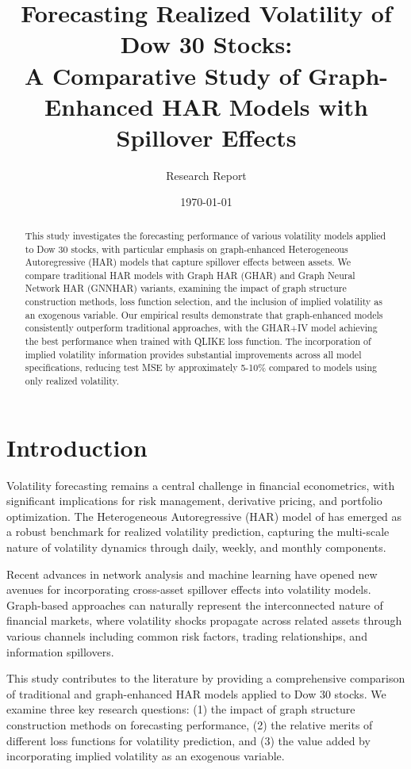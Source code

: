 \documentclass[12pt,a4paper]{article}
\title{Forecasting Realized Volatility of Dow 30 Stocks: \\
A Comparative Study of Graph-Enhanced HAR Models with Spillover Effects}
\author{Research Report}
\date{\today}
\begin{document}
\maketitle

\begin{abstract}
This study investigates the forecasting performance of various volatility models applied to Dow 30 stocks, with particular emphasis on graph-enhanced Heterogeneous Autoregressive (HAR) models that capture spillover effects between assets. We compare traditional HAR models with Graph HAR (GHAR) and Graph Neural Network HAR (GNNHAR) variants, examining the impact of graph structure construction methods, loss function selection, and the inclusion of implied volatility as an exogenous variable. Our empirical results demonstrate that graph-enhanced models consistently outperform traditional approaches, with the GHAR+IV model achieving the best performance when trained with QLIKE loss function. The incorporation of implied volatility information provides substantial improvements across all model specifications, reducing test MSE by approximately 5-10\% compared to models using only realized volatility.
\end{abstract}

\section{Introduction}

Volatility forecasting remains a central challenge in financial econometrics, with significant implications for risk management, derivative pricing, and portfolio optimization. The Heterogeneous Autoregressive (HAR) model of \cite{corsi2009simple} has emerged as a robust benchmark for realized volatility prediction, capturing the multi-scale nature of volatility dynamics through daily, weekly, and monthly components.

Recent advances in network analysis and machine learning have opened new avenues for incorporating cross-asset spillover effects into volatility models. Graph-based approaches can naturally represent the interconnected nature of financial markets, where volatility shocks propagate across related assets through various channels including common risk factors, trading relationships, and information spillovers.

This study contributes to the literature by providing a comprehensive comparison of traditional and graph-enhanced HAR models applied to Dow 30 stocks. We examine three key research questions: (1) the impact of graph structure construction methods on forecasting performance, (2) the relative merits of different loss functions for volatility prediction, and (3) the value added by incorporating implied volatility as an exogenous variable.
\end{document}
